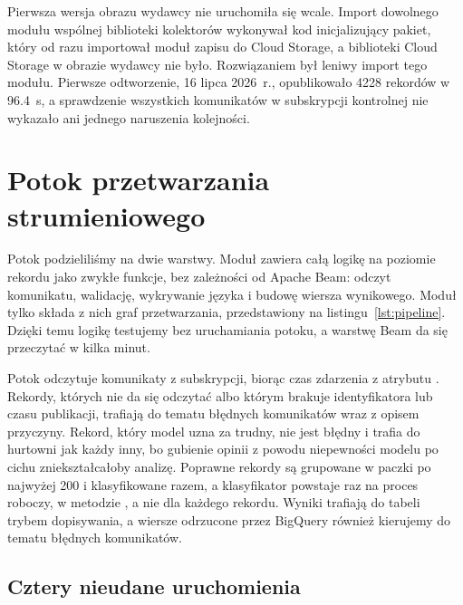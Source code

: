 Pierwsza wersja obrazu wydawcy nie uruchomiła się wcale.
Import dowolnego modułu wspólnej biblioteki kolektorów wykonywał kod inicjalizujący pakiet, który od razu importował moduł zapisu do Cloud Storage, a biblioteki Cloud Storage w obrazie wydawcy nie było.
Rozwiązaniem był leniwy import tego modułu.
Pierwsze odtworzenie, 16 lipca 2026~r., opublikowało \num{4228} rekordów w \qty{96.4}{\second}, a sprawdzenie wszystkich komunikatów w subskrypcji kontrolnej nie wykazało ani jednego naruszenia kolejności.

\section{Potok przetwarzania strumieniowego}
\label{sec:impl-pipeline}

Potok podzieliliśmy na dwie warstwy.
Moduł  zawiera całą logikę na poziomie rekordu jako zwykłe funkcje, bez zależności od Apache Beam: odczyt komunikatu, walidację, wykrywanie języka i budowę wiersza wynikowego.
Moduł  tylko składa z nich graf przetwarzania, przedstawiony na listingu~\ref{lst:pipeline}.
Dzięki temu logikę testujemy bez uruchamiania potoku, a warstwę Beam da się przeczytać w kilka minut.



Potok odczytuje komunikaty z subskrypcji, biorąc czas zdarzenia z atrybutu .
Rekordy, których nie da się odczytać albo którym brakuje identyfikatora lub czasu publikacji, trafiają do tematu błędnych komunikatów wraz z opisem przyczyny.
Rekord, który model uzna za trudny, nie jest błędny i trafia do hurtowni jak każdy inny, bo gubienie opinii z powodu niepewności modelu po cichu zniekształcałoby analizę.
Poprawne rekordy są grupowane w paczki po najwyżej 200 i klasyfikowane razem, a klasyfikator powstaje raz na proces roboczy, w metodzie , a nie dla każdego rekordu.
Wyniki trafiają do tabeli  trybem dopisywania, a wiersze odrzucone przez BigQuery również kierujemy do tematu błędnych komunikatów.

\subsection{Cztery nieudane uruchomienia}
\label{sec:impl-launch-failures}

